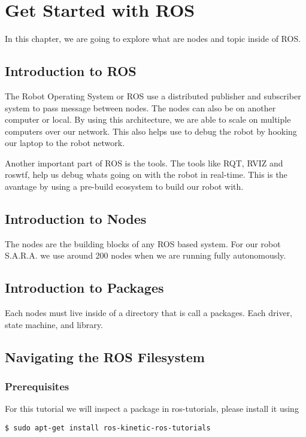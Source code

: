 \chapter{Get Started with ROS}
In this chapter, we are going to explore what are nodes and topic inside of ROS.

\newpage
\section{Introduction to ROS}
 The Robot Operating System or ROS use a distributed publisher and subscriber system to pass message between nodes. The nodes can also be on another computer or local. By using this architecture, we are able to scale on multiple computers over our network. This also helps use to debug the robot by hooking our laptop to the robot network. 
 
 Another important part of ROS is the tools. The tools like RQT, RVIZ and roswtf, help us debug whats going on with the robot in real-time. This is the avantage by using a pre-build ecosystem to build our robot with.

\newpage

\section{Introduction to Nodes}
The nodes are the building blocks of any ROS based system. For our robot S.A.R.A. we use around 200 nodes when we are running fully autonomously. 

\newpage

\section{Introduction to Packages}
Each nodes must live inside of a directory that is call a packages. Each driver, state machine, and library. 

\newpage

\section{Navigating the ROS Filesystem}
\subsection{Prerequisites}
For this tutorial we will inspect a package in ros-tutorials, please install it using

\begin{lstlisting}[breaklines=True language=bash]
$ sudo apt-get install ros-kinetic-ros-tutorials
\end{lstlisting}

